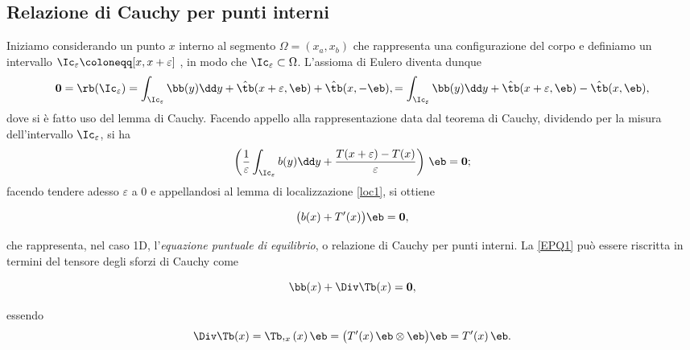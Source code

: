 \subsection{Relazione di Cauchy per punti interni}
Iniziamo considerando un punto $x$ interno al segmento $\Omega=(x_a, x_b)$ che rappresenta una configurazione del corpo e definiamo un intervallo $\Ic_\varepsilon\coloneqq [x,x+\varepsilon]$ , in modo che $\Ic_\varepsilon\subset\Omega$. L'assioma di Eulero diventa dunque
\begin{equation}
\mathbf{0}=\rb(\Ic_\varepsilon)=\int_{\Ic_\varepsilon}\bb(y)\dd y+\hat\tb(x+\varepsilon,\eb)+\hat{\tb}(x,-\eb),
=\int_{\Ic_\varepsilon}\bb(y)\dd y+\hat\tb(x+\varepsilon,\eb)-\hat{\tb}(x,\eb),
\end{equation}
dove si è fatto uso del lemma di Cauchy. Facendo appello alla rappresentazione data dal teorema di Cauchy, dividendo per la misura dell'intervallo $\Ic_\varepsilon$, si ha
\begin{equation}
\left( \frac{1}{\varepsilon}\int_{\Ic_\varepsilon}b(y)\dd y+\frac{T(x+\varepsilon)-T(x)}{\varepsilon}\right)\,\eb=\mathbf{0};
\end{equation}
facendo tendere adesso $\varepsilon$ a 0 e appellandosi al lemma di localizzazione \eqref{loc1}, si ottiene
\begin{definition}
	\begin{equation}\label{EPQ1}
	\big(b(x)+T'(x)\big)\eb=\mathbf{0},
\end{equation}
\end{definition}
 che rappresenta, nel caso 1D, l'\textit{equazione puntuale di equilibrio}, o relazione di Cauchy per punti interni.  La \eqref{EPQ1} può essere riscritta in termini del tensore degli sforzi di Cauchy come
\begin{definition}
	\begin{equation}
\bb(x)+\Div\Tb(x)=\mathbf{0},
\end{equation}
\end{definition}
essendo
\begin{equation}
\Div\Tb(x)=\Tb,_x(x)\,\eb=\big(T'(x)  \,\eb\otimes \eb\big)\eb=T'(x)\,  \eb.
\end{equation}

